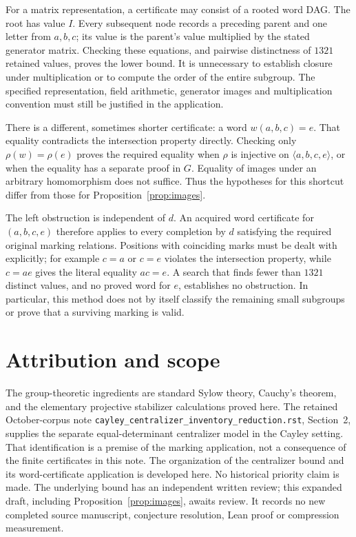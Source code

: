 \documentclass[11pt]{article}
\begin{document}
For a matrix representation, a certificate may consist of a rooted word
DAG. The root has value $I$. Every subsequent node records a preceding
parent and one letter from $a,b,c$; its value is the parent's value
multiplied by the stated generator matrix. Checking these equations,
and pairwise distinctness of $1321$ retained values, proves the lower
bound. It is unnecessary to establish closure under multiplication or
to compute the order of the entire subgroup. The specified representation,
field arithmetic, generator images and multiplication convention must
still be justified in the application.

There is a different, sometimes shorter certificate: a word $w(a,b,c)=e$.
That equality contradicts the intersection property directly. Checking
only $\rho(w)=\rho(e)$ proves the required equality when $\rho$ is
injective on $\langle a,b,c,e\rangle$, or when the equality has a separate
proof in $G$. Equality of images under an arbitrary homomorphism does
not suffice. Thus the hypotheses for this shortcut differ from those
for Proposition~\ref{prop:images}.

The left obstruction is independent of $d$. An acquired word certificate
for $(a,b,c,e)$ therefore applies to every completion by $d$ satisfying
the required original marking relations. Positions with coinciding marks
must be dealt with explicitly; for example $c=a$ or $c=e$ violates the
intersection property, while $c=ae$ gives the literal equality $ac=e$.
A search that finds fewer than $1321$ distinct values, and no proved word
for $e$, establishes no obstruction. In particular, this method does
not by itself classify the remaining small subgroups or prove that a
surviving marking is valid.

\section*{Attribution and scope}
The group-theoretic ingredients are standard Sylow theory, Cauchy's theorem,
and the elementary projective stabilizer calculations proved here. The
retained October-corpus note \texttt{cayley\_centralizer\_inventory\_reduction.rst},
Section~2, supplies the separate equal-determinant centralizer model in
the Cayley setting. That identification is a premise of the marking
application, not a consequence of the finite certificates in this note.
The organization of the centralizer bound and its word-certificate
application is developed here. No historical priority claim is made.
The underlying bound has an independent written review; this expanded
draft, including Proposition~\ref{prop:images}, awaits review. It records
no new completed source manuscript, conjecture resolution, Lean proof
or compression measurement.
\end{document}
